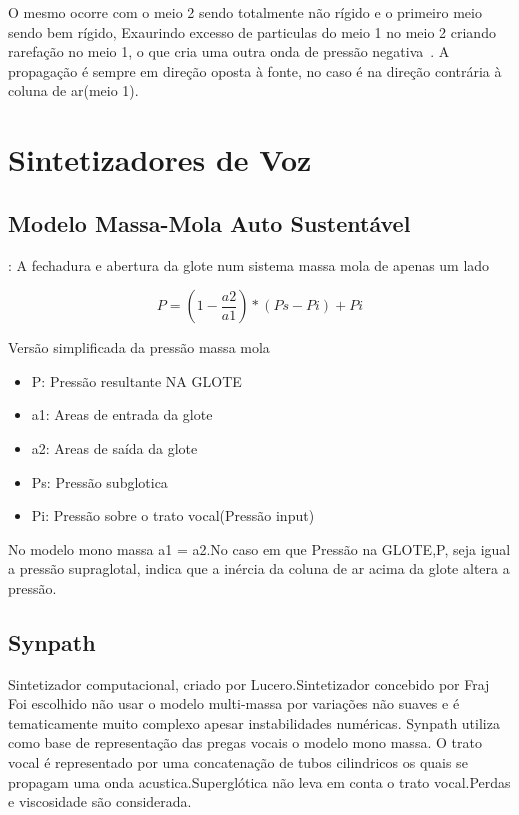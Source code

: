 		O mesmo ocorre com o meio 2 sendo totalmente não rígido e o primeiro meio sendo bem rígido, Exaurindo excesso de particulas  do meio 1 no meio 2 criando rarefação no meio 1, o que cria uma outra onda de pressão negativa~\cite{FlanaganLandgraf}. A propagação é sempre em direção oposta à fonte, no caso é na direção contrária à coluna de ar(meio 1). 
		
	
	
		





\section{Sintetizadores de Voz}
	\subsection{Modelo Massa-Mola Auto Sustentável}:
	A fechadura e abertura da glote num sistema massa mola de apenas um lado

	\[
		P = (1 - \frac{a2}{a1})*(Ps- Pi) + Pi
	\]
		
	
	Versão simplificada da pressão massa mola
	\begin{itemize}
		\item P: Pressão resultante NA GLOTE
		\item a1: Areas de entrada da glote
		\item a2: Areas de saída  da glote
		\item Ps: Pressão subglotica
		\item Pi: Pressão sobre o trato vocal(Pressão input)
	\end{itemize}
	
		No modelo mono massa a1 = a2.No caso em que Pressão na GLOTE,P, seja  igual a pressão  supraglotal, indica que a inércia da coluna de ar acima da glote altera a pressão.
	
	
	\subsection{Synpath}
		Sintetizador computacional, criado por Lucero.Sintetizador concebido por Fraj \cite{JeanFrancis}
		Foi escolhido não usar o modelo multi-massa por variações não suaves  e é tematicamente muito complexo apesar instabilidades numéricas.
		Synpath utiliza como base de representação das pregas vocais o modelo mono massa. O trato vocal é representado por uma concatenação de tubos cilindricos os quais se propagam uma onda acustica.Superglótica não leva em conta o trato vocal.Perdas e viscosidade são considerada.
	
